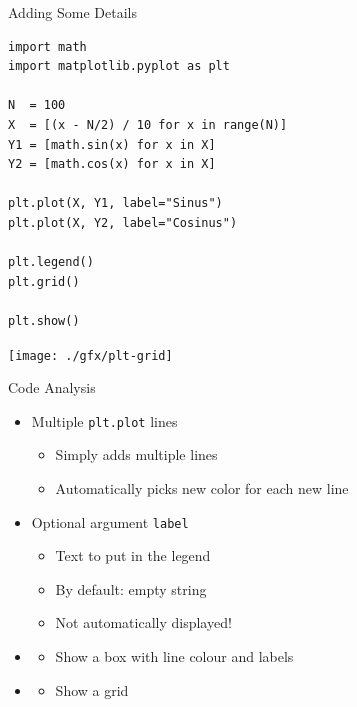 \begin{frame}[fragile]{Adding Some Details}
%
\begin{codebox}[Example: Plot with Grid and Legend, width=.49\linewidth, nobeforeafter, equal height group = grpXmpGrid]
\begin{verbatim}
import math
import matplotlib.pyplot as plt

N  = 100
X  = [(x - N/2) / 10 for x in range(N)]
Y1 = [math.sin(x) for x in X]
Y2 = [math.cos(x) for x in X]

plt.plot(X, Y1, label="Sinus")
plt.plot(X, Y2, label="Cosinus")

plt.legend()
plt.grid()

plt.show()
\end{verbatim}
\end{codebox}
%
\begin{tcolorbox}[title=Output: Plot with Grid and Legend, width=.49\linewidth, nobeforeafter, equal height group = grpXmpGrid]
	\texttt{[image: ./gfx/plt-grid]}
\end{tcolorbox}
%
\end{frame}


\begin{frame}[fragile]{Code Analysis}
%
\begin{itemize}
\item Multiple \texttt{plt.plot} lines
	\begin{itemize}
	\item Simply adds multiple lines
	\item Automatically picks new color for each new line
	\end{itemize}
\item Optional argument \texttt{label}
	\begin{itemize}
	\item Text to put in the legend
	\item By default: empty string
	\item Not automatically displayed!
	\end{itemize}
\item {}
	\begin{itemize}
	\item Show a box with line colour and labels
	\end{itemize}
\item {}
	\begin{itemize}
	\item Show a grid
	\end{itemize}
\end{itemize}
%
\end{frame}

